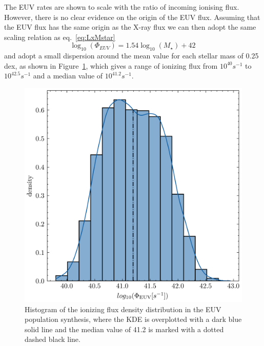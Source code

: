 \documentclass[fleqn,usenatbib,letters]{mnras}
\begin{document}
The EUV rates are shown to scale with the ratio of incoming ionising flux. However, there is no clear evidence on the origin of the EUV flux. Assuming that the EUV flux has the same origin as the X-ray flux we can then adopt the same scaling relation as eq.~\ref{eq:LxMstar}
\begin{equation} \label{eq:PhiEUVMstar}
    \log_{10}(\Phi_{EUV}) = 1.54 \log_{10}(M_\star) + 42 \,
\end{equation}
and adopt a small dispersion around the mean value for each stellar mass of 0.25 dex, as shown in Figure~\ref{fig:phiEUV}, which gives a range of ionizing flux from $10^{40} s^{-1}$ to $10^{42.5} s^{-1}$ and a median value of $10^{41.2} s^{-1}$.
\begin{figure}
    \includegraphics[width=\columnwidth]{phi_EUV}
    \caption{Histogram of the ionizing flux density distribution in the EUV population synthesis, where the KDE is overplotted with a dark blue solid line and the median value of 41.2 is marked with a dotted dashed black line. \label{fig:phiEUV}}
\end{figure}
\end{document}
